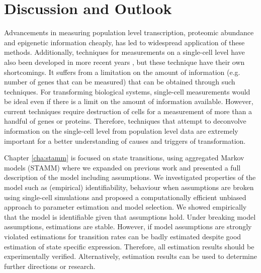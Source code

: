 
\chapter{Discussion and Outlook}
\label{cha:discussion-outlook}

Advancements in measuring population level transcription, proteomic abundance and epigenetic information cheaply, has led to widespread application of these methods. Additionally, techniques for measurements on a single-cell level have also been developed in more recent years \citep{Wheeler:2003ka, Dalerba:2011cc, Wang:2010ew}, but these technique have their own shortcomings. It suffers from a limitation on the amount of information (e.g. number of genes that can be measured) that can be obtained through such techniques. For transforming biological systems, single-cell measurements would be ideal even if there is a limit on the amount of information available. However, current techniques require destruction of cells for a measurement of more than a handful of genes or proteins. Therefore, techniques that attempt to deconvolve information on the single-cell level from population level data are extremely important for a better understanding of causes and triggers of transformation.

Chapter \ref{cha:stamm} is focused on state transitions, using aggregated Markov models (STAMM) where we expanded on previous work \citep{Armond:2013} and presented a full description of the model including assumptions. We investigated properties of the model such as (empirical) identifiability, behaviour when assumptions are broken using single-cell simulations and proposed a computationally efficient unbiased approach to parameter estimation and model selection. We showed empirically that the model is identifiable given that assumptions hold. Under breaking model assumptions, estimations are stable. However, if model assumptions are strongly violated estimations for transition rates can be badly estimated despite good estimation of state specific expression. Therefore, all estimation results should be experimentally verified. Alternatively, estimation results can be used to determine further directions or research.

